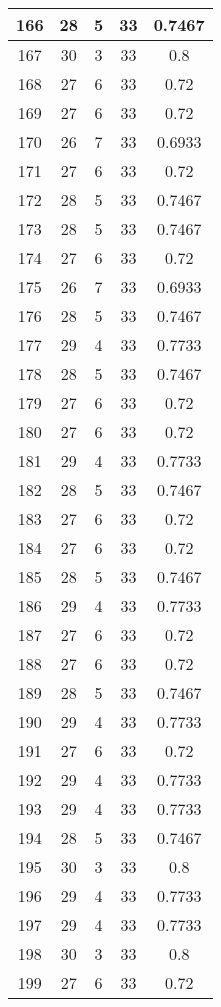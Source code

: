 \documentclass[letterpaper, 12pt]{article}
\begin{document}
\begin{longtable}{|c|c|c|c|c|}
\hline
166 & 28 & 5 & 33 & 0.7467 \\
\hline
167 & 30 & 3 & 33 & 0.8 \\
\hline
168 & 27 & 6 & 33 & 0.72 \\
\hline
169 & 27 & 6 & 33 & 0.72 \\
\hline
170 & 26 & 7 & 33 & 0.6933 \\
\hline
171 & 27 & 6 & 33 & 0.72 \\
\hline
172 & 28 & 5 & 33 & 0.7467 \\
\hline
173 & 28 & 5 & 33 & 0.7467 \\
\hline
174 & 27 & 6 & 33 & 0.72 \\
\hline
175 & 26 & 7 & 33 & 0.6933 \\
\hline
176 & 28 & 5 & 33 & 0.7467 \\
\hline
177 & 29 & 4 & 33 & 0.7733 \\
\hline
178 & 28 & 5 & 33 & 0.7467 \\
\hline
179 & 27 & 6 & 33 & 0.72 \\
\hline
180 & 27 & 6 & 33 & 0.72 \\
\hline
181 & 29 & 4 & 33 & 0.7733 \\
\hline
182 & 28 & 5 & 33 & 0.7467 \\
\hline
183 & 27 & 6 & 33 & 0.72 \\
\hline
184 & 27 & 6 & 33 & 0.72 \\
\hline
185 & 28 & 5 & 33 & 0.7467 \\
\hline
186 & 29 & 4 & 33 & 0.7733 \\
\hline
187 & 27 & 6 & 33 & 0.72 \\
\hline
188 & 27 & 6 & 33 & 0.72 \\
\hline
189 & 28 & 5 & 33 & 0.7467 \\
\hline
190 & 29 & 4 & 33 & 0.7733 \\
\hline
191 & 27 & 6 & 33 & 0.72 \\
\hline
192 & 29 & 4 & 33 & 0.7733 \\
\hline
193 & 29 & 4 & 33 & 0.7733 \\
\hline
194 & 28 & 5 & 33 & 0.7467 \\
\hline
195 & 30 & 3 & 33 & 0.8 \\
\hline
196 & 29 & 4 & 33 & 0.7733 \\
\hline
197 & 29 & 4 & 33 & 0.7733 \\
\hline
198 & 30 & 3 & 33 & 0.8 \\
\hline
199 & 27 & 6 & 33 & 0.72 \\
\hline
\end{longtable}
\end{document}
